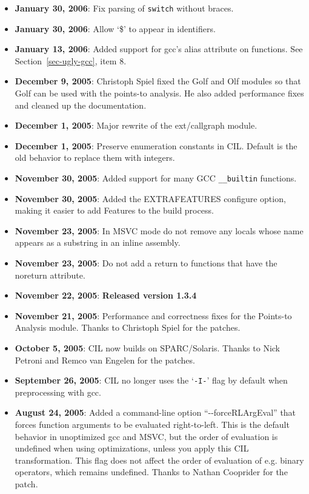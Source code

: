 \documentclass[letterpaper]{article}
\def\secref#1{Section~\ref{sec-#1}}
\def\t#1{{\tt #1}}
\begin{document}
\begin{itemize}
\item {\bf January 30, 2006}: Fix parsing of \t{switch} without braces.
\item {\bf January 30, 2006}: Allow `\$' to appear in identifiers.
\item {\bf January 13, 2006}: Added support for gcc's alias attribute
  on functions.  See \secref{ugly-gcc}, item 8.  
\item {\bf December 9, 2005}: Christoph Spiel fixed the Golf and
  Olf modules so that Golf can be used with the points-to analysis.
  He also added performance fixes and cleaned up the documentation.
\item {\bf December 1, 2005}: Major rewrite of the ext/callgraph module. 
\item {\bf December 1, 2005}: Preserve enumeration constants in CIL. Default
is the old behavior to replace them with integers.
\item {\bf November 30, 2005}: Added support for many GCC \t{\_\_builtin}
  functions. 
\item {\bf November 30, 2005}: Added the EXTRAFEATURES configure
  option, making it easier to add Features to the build process.
\item {\bf November 23, 2005}: In MSVC mode do not remove any locals whose name
  appears as a substring in an inline assembly. 
\item {\bf November 23, 2005}: Do not add a return to functions that have the
  noreturn attribute. 
\item {\bf November 22, 2005}: {\bf Released version 1.3.4}
\item {\bf November 21, 2005}: Performance and correctness fixes for
  the Points-to Analysis module.  Thanks to Christoph Spiel for the
  patches.
\item {\bf October 5, 2005}: CIL now builds on SPARC/Solaris.  Thanks
  to Nick Petroni and Remco van Engelen for the patches.
\item {\bf September 26, 2005}: CIL no longer uses the `\t{-I-}' flag
  by default when preprocessing with gcc.
\item {\bf August 24, 2005}: Added a command-line option
  ``-{}-forceRLArgEval'' that forces function arguments to be evaluated
  right-to-left.  This is the default behavior in unoptimized gcc and
  MSVC, but the order of evaluation is undefined when using
  optimizations, unless you apply this CIL transformation.  This flag
  does not affect the order of evaluation of e.g. binary operators,
  which remains undefined.  Thanks to Nathan Cooprider for the patch.

\end{itemize}
\end{document}
